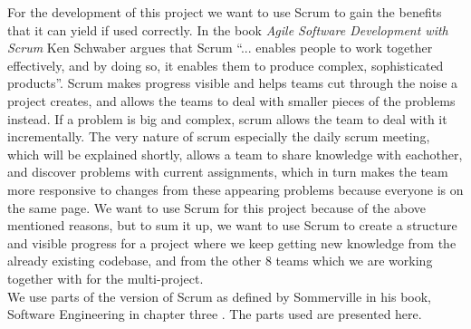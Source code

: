 For the development of this project we want to use Scrum to gain the benefits that it can yield if used correctly.
In the book \textit{Agile Software Development with Scrum} Ken Schwaber argues that Scrum \enquote{... enables people to work together effectively, and by doing so, it enables them to produce complex, sophisticated products}\cite{scrumbookschwaber}.
Scrum makes progress visible and helps teams cut through the noise a project creates, and allows the teams to deal with smaller pieces of the problems instead.
If a problem is big and complex, scrum allows the team to deal with it incrementally.
The very nature of scrum especially the daily scrum meeting, which will be explained shortly, allows a team to share knowledge with eachother, and discover problems with current assignments, which in turn makes the team more responsive to changes from these appearing problems because everyone is on the same page.
We want to use Scrum for this project because of the above mentioned reasons, but to sum it up, we want to use Scrum to create a structure and visible progress for a project where we keep getting new knowledge from the already existing codebase, and from the other 8 teams which we are working together with for the multi-project.
\\ 

We use parts of the version of Scrum as defined by Sommerville in his book, Software Engineering in chapter three \cite{SEBOOK}.
The parts used are presented here.

